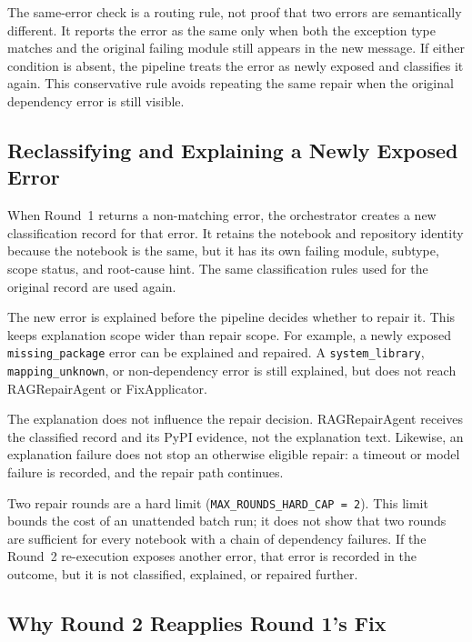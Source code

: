 The same-error check is a routing rule, not proof that two errors are
semantically different. It reports the error as the same only when both the
exception type matches and the original failing module still appears in the
new message. If either condition is absent, the pipeline treats the error as
newly exposed and classifies it again. This conservative rule avoids repeating
the same repair when the original dependency error is still visible.

\subsection{Reclassifying and Explaining a Newly Exposed Error}
\label{sec:m-orchestrator-round2-explain}

When Round~1 returns a non-matching error, the orchestrator creates a new
classification record for that error. It retains the notebook and repository
identity because the notebook is the same, but it has its own failing module,
subtype, scope status, and root-cause hint. The same classification rules used
for the original record are used again.

The new error is explained before the pipeline decides whether to repair it.
This keeps explanation scope wider than repair scope. For example, a newly
exposed \texttt{missing\_package} error can be explained and repaired. A
\texttt{system\_library}, \texttt{mapping\_unknown}, or non-dependency error
is still explained, but does not reach RAGRepairAgent or FixApplicator.

The explanation does not influence the repair decision. RAGRepairAgent receives
the classified record and its PyPI evidence, not the explanation text. Likewise,
an explanation failure does not stop an otherwise eligible repair: a timeout or
model failure is recorded, and the repair path continues.

Two repair rounds are a hard limit (\texttt{MAX\_ROUNDS\_HARD\_CAP = 2}). This
limit bounds the cost of an unattended batch run; it does not show that two
rounds are sufficient for every notebook with a chain of dependency failures.
If the Round~2 re-execution exposes another error, that error is recorded in
the outcome, but it is not classified, explained, or repaired further.

\subsection{Why Round 2 Reapplies Round 1's Fix}
\label{sec:m-fixapply-round2}

